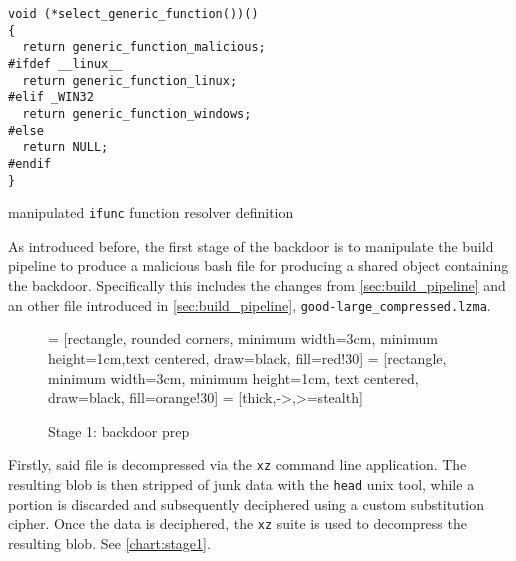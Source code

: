 \begin{listing}[H]
    \begin{verbatim}
void (*select_generic_function())() 
{
  return generic_function_malicious;
#ifdef __linux__
  return generic_function_linux;
#elif _WIN32
  return generic_function_windows;
#else
  return NULL;
#endif
}
    \end{verbatim}
    \label{code:example_ifunc_backdoor_resolver}
    \caption{manipulated \texttt{ifunc} function resolver definition}
\end{listing}

As introduced before, the first stage of the backdoor is to manipulate the
build pipeline to produce a malicious bash file for producing a shared object
containing the backdoor. Specifically this includes the changes from
\autoref{sec:build_pipeline} and an other file introduced in
\autoref{sec:build_pipeline}, \texttt{good-large\_compressed.lzma}.

\begin{figure}[H]
    \centering

     = [rectangle, rounded corners, minimum width=3cm, minimum height=1cm,text centered, draw=black, fill=red!30]
     = [rectangle, minimum width=3cm, minimum height=1cm, text centered, draw=black, fill=orange!30]
     = [thick,->,>=stealth]
    \label{chart:stage1}
    \caption{Stage 1: backdoor prep}
\end{figure}

Firstly, said file is decompressed via the \texttt{xz} command line
application. The resulting blob is then stripped of junk data with the
\texttt{head} unix tool, while a portion is discarded and subsequently
deciphered using a custom substitution cipher. Once the data is deciphered, the
\texttt{xz} suite is used to decompress the resulting blob. See
\autoref{chart:stage1}.

